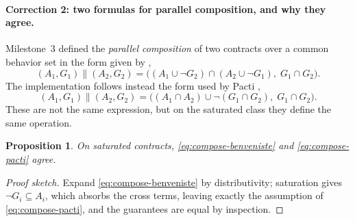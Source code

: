 \documentclass[11pt]{article}
\newif\ifshowcomments
\newtheorem{proposition}{Proposition}
\theoremstyle{definition}
\theoremstyle{remark}
\newcommand{\ai}[1]{%
    \ifshowcomments
        \noindent\textcolor{techred}{[AI Agent]: #1}%
    \fi
}
\begin{document}
\ai{This is not bookkeeping. Two of the four embedding maps of \S\ref{sec:embeddings} carry a
universal quantifier on the guarantee leg, and $\forall$ does not distribute over $\vee$.
Feeding such a map an unsaturated representative therefore returns a genuinely different
contract and breaks the very adjunctions the Laplacian rests on. Milestone~3's phrasing
(``we may assume saturation if needed'') leaves the door open to exactly that error. That all
six contract operations preserve the saturated class---so that the quotient is well defined
through the whole algebra---is checked by \testname{test_operations_preserve_saturation}.}

\paragraph{Correction 2: two formulas for parallel composition, and why they agree.}
Milestone~3 defined the \emph{parallel composition} of two contracts over a common behavior set
in the form given by \citet{benvenisteContractsSystemDesign2012},
\begin{equation}
\label{eq:compose-benveniste}
(A_1, G_1) \parallel (A_2, G_2)
  = \bigl((A_1 \cup \neg G_2) \cap (A_2 \cup \neg G_1),\; G_1 \cap G_2\bigr).
\end{equation}
The implementation follows instead the form used by Pacti
\citep{incerPactiAssumeGuaranteeContracts2025},
\begin{equation}
\label{eq:compose-pacti}
(A_1, G_1) \parallel (A_2, G_2)
  = \bigl((A_1 \cap A_2) \cup \neg(G_1 \cap G_2),\; G_1 \cap G_2\bigr).
\end{equation}
These are not the same expression, but on the saturated class they define the same operation.

\begin{proposition}
\label{prop:compose-agree}
On saturated contracts, \eqref{eq:compose-benveniste} and \eqref{eq:compose-pacti} agree.
\end{proposition}

\begin{proof}[Proof sketch]
Expand \eqref{eq:compose-benveniste} by distributivity; saturation gives
$\neg G_i \subseteq A_i$, which absorbs the cross terms, leaving exactly the assumption of
\eqref{eq:compose-pacti}, and the guarantees are equal by inspection.
\end{proof}

\ai{This is a reconciliation, not an erratum: Milestone~3's formula was correct. It is recorded
because the two forms look different enough that a reader checking the code against the report
would reasonably conclude one of them is wrong, and because the equivalence is exactly where
saturation is doing the work. \Cref{eq:compose-pacti} is the form retained, since it is the one
for which the quotient below is a genuine right adjoint.}
\end{document}
